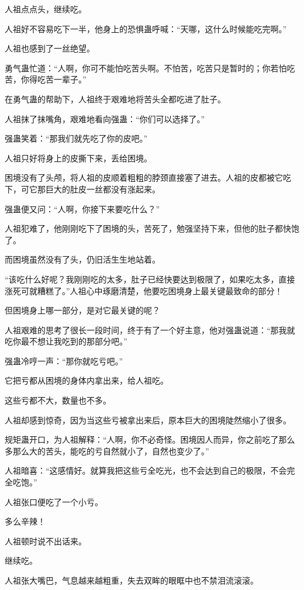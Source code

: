 \begin{this_body}
人祖点点头，继续吃。

人祖好不容易吃下一半，他身上的恐惧蛊呼喊：“天哪，这什么时候能吃完啊。”

人祖也感到了一丝绝望。

勇气蛊忙道：“人啊，你可不能怕吃苦头啊。不怕苦，吃苦只是暂时的；你若怕吃苦，你得吃苦一辈子。”

在勇气蛊的帮助下，人祖终于艰难地将苦头全都吃进了肚子。

人祖抹了抹嘴角，艰难地看向强蛊：“你们可以选择了。”

强蛊笑着：“那我们就先吃了你的皮吧。”

人祖只好将身上的皮撕下来，丢给困境。

困境没有了头颅，将人祖的皮顺着粗粗的脖颈直接塞了进去。人祖的皮都被它吃下，可它那巨大的肚皮一丝都没有涨起来。

强蛊便又问：“人啊，你接下来要吃什么？”

人祖犯难了，他刚刚吃下了困境的头，苦死了，勉强坚持下来，但他的肚子都快饱了。

而困境虽然没有了头，仍旧活生生地站着。

“该吃什么好呢？我刚刚吃的太多，肚子已经快要达到极限了，如果吃太多，直接涨死可就糟糕了。”人祖心中琢磨清楚，他要吃困境身上最关键最致命的部分！

但困境身上哪一部分，是对它最关键的呢？

人祖艰难的思考了很长一段时间，终于有了一个好主意，他对强蛊说道：“那我就吃你最不想让我吃到的那部分吧。”

强蛊冷哼一声：“那你就吃亏吧。”

它把亏都从困境的身体内拿出来，给人祖吃。

这些亏都不大，数量也不多。

人祖却感到惊奇，因为当这些亏被拿出来后，原本巨大的困境陡然缩小了很多。

规矩蛊开口，为人祖解释：“人啊，你不必奇怪。困境因人而异，你之前吃了那么多那么大的苦头，能吃的亏自然就小了，自然也变少了。”

人祖暗喜：“这感情好。就算我把这些亏全吃光，也不会达到自己的极限，不会完全吃饱。”

人祖张口便吃了一个小亏。

多么辛辣！

人祖顿时说不出话来。

继续吃。

人祖张大嘴巴，气息越来越粗重，失去双眸的眼眶中也不禁泪流滚滚。


\end{this_body}

